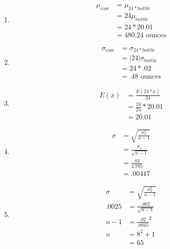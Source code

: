 \documentclass[12pt]{report}
\begin{document}
   \begin{enumerate}[label={\bf \alph*}]
   \item
   \begin{align*}
      \mu_{\text{case}} &= \mu_{24*\text{bottle}}\\
                        &= 24\mu_{\text{bottle}}\\
                        &= 24 * 20.01\\
                        &= 480.24\text{ ounces}
   \end{align*}
   \item
      \begin{align*}
      \sigma_{\text{case}} &=\sigma_{24*\text{bottle}}\\
                           &=|24|\sigma_\text{bottle}\\
                           &=24*.02\\
                           &= .48 \text{ ounces}
      \end{align*}
      \item
      \begin{align*}
      E(\bar{x})&= \frac{E(24*x)}{24}\\
                    &=\frac{24}{24}*20.01\\
                    &=20.01
      \end{align*}
      \item
      \begin{align*}
      \sigma &= \sqrt{\frac{\sigma^2_x}{n-1}}\\
             &= \frac{\sigma_x}{\sqrt{n-1}}\\
             &= \frac{.02}{4.795}\\
             &= .00417
      \end{align*}
      \item
      \begin{align*}
      \sigma &= \sqrt{\frac{\sigma^2_x}{n-1}}\\
      .0025  &=\frac{.002}{\sqrt{n-1}}\\
      n-1    &= \frac{.02}{.0025}^2\\
      n      &= 8^2 +1 \\
             &= 65
     \end{align*}
 \end{enumerate}
   
\end{document}
